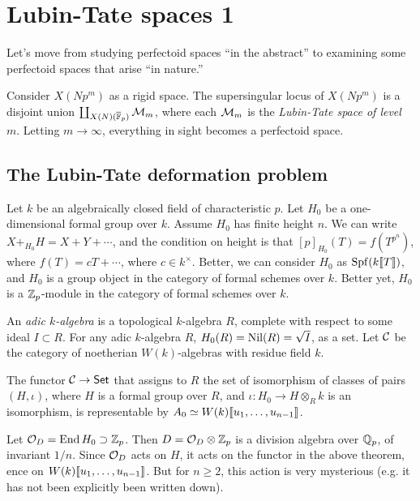 
\section{Lubin-Tate spaces 1}






Let's move from studying perfectoid spaces ``in the abstract'' to examining some 
perfectoid spaces that arise ``in nature.'' 

Consider $X(N p^m)$ as a rigid space. The supersingular locus of $X(N p^m)$ is 
a disjoint union $\coprod_{X(N)(\overline{\mathbb{F}}_p)} \mathcal{M}_m$, where each $\mathcal{M}_m$ is 
the \emph{Lubin-Tate space of level $m$}. Letting $m\to \infty$, everything 
in sight becomes a perfectoid space. 





\subsection{The Lubin-Tate deformation problem}

Let $k$ be an algebraically closed field of characteristic $p$. Let $H_0$ be a 
one-dimensional formal group over $k$. Assume $H_0$ has finite height $n$. 
We can write $X+_{H_0} H = X+Y+\cdots$, and the condition on height is that 
$[p]_{H_0}(T) = f(T^{p^n})$, where $f(T) = c T+\cdots$, where 
$c\in k^\times$. Better, we can consider $H_0$ as $\operatorname{Spf}(k\llbracket {T} \rrbracket)$, and $H_0$ 
is a group object in the category of formal schemes over $k$. Better yet, 
$H_0$ is a $\mathbb{Z}_p$-module in the category of formal schemes over $k$. 

An \emph{adic $k$-algebra} is a topological $k$-algebra $R$, complete with 
respect to some ideal $I\subset R$. For any adic $k$-algebra $R$, 
$H_0(R)=\operatorname{Nil}(R)=\sqrt I$, as a set. Let $\mathcal{C}$ be the category of noetherian 
$W(k)$-algebras with residue field $k$. 


\begin{theorem}
The functor $\mathcal{C}\to \mathsf{Set}$ that assigns to $R$ the set of isomorphism 
of classes of pairs $(H,\iota)$, where $H$ is a formal group over $R$, and 
$\iota:H_0 \to H\otimes_R k$ is an isomorphism, is representable by 
$A_0\simeq W(k)\llbracket {u_1,\dots,u_{n-1}} \rrbracket$. 
\end{theorem}

Let $\mathcal{O}_D=\operatorname{End} H_0 \supset \mathbb{Z}_p$. Then $D=\mathcal{O}_D\otimes\mathbb{Z}_p$ is a division 
algebra over $\mathbb{Q}_p$, of invariant $1/n$. Since $\mathcal{O}_D$ acts on $H$, it acts 
on the functor in the above theorem, ence on $W(k)\llbracket {u_1,\dots,u_{n-1}} \rrbracket$. But 
for $n\geqslant 2$, this action is very mysterious (e.g. it has not been 
explicitly been written down). 

